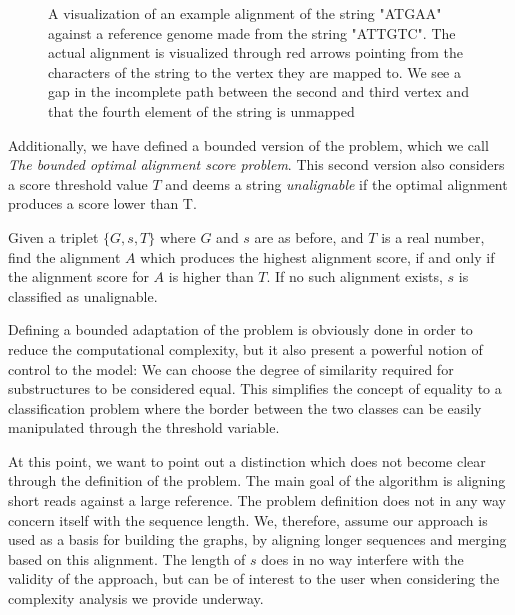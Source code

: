 \documentclass[thesis.tex]{subfiles}
\begin{document}
{\begin{figure}[htpb]
\begin{mdframed}
\begin{center}
    \end{center}
  \end{mdframed}
  \caption[An example alignment]{A visualization of an example alignment of the string "ATGAA" against a reference genome made from the string "ATTGTC". The actual alignment is visualized through red arrows pointing from the characters of the string to the vertex they are mapped to. We see a gap in the incomplete path between the second and third vertex and that the fourth element of the string is unmapped}
\end{figure}
\par\noindent
Additionally, we have defined a bounded version of the problem, which we call \textit{The bounded optimal alignment score problem}. This second version also considers a score threshold value $T$ and deems a string  \textit{unalignable} if the optimal alignment produces a score lower than T.
\begin{defn}
  \label{def:bounded_alignment_problem}
  Given a triplet $\{G, s, T\}$ where $G$ and $s$ are as before, and $T$ is a real number, find the alignment $A$ which produces the highest alignment score, if and only if the alignment score for $A$ is higher than $T$. If no such alignment exists, $s$ is classified as unalignable.
\end{defn}
Defining a bounded adaptation of the problem is obviously done in order to reduce the computational complexity, but it also present a powerful notion of control to the model: We can choose the degree of similarity required for substructures to be considered equal. This simplifies the concept of equality to a classification problem where the border between the two classes can be easily manipulated through the threshold variable.\\
\par\noindent
At this point, we want to point out a distinction which does not become clear through the definition of the problem. The main goal of the algorithm is aligning short reads against a large reference. The problem definition does not in any way concern itself with the sequence length. We, therefore, assume our approach is used as a basis for building the graphs, by aligning longer sequences and merging based on this alignment. The length of $s$ does in no way interfere with the validity of the approach, but can be of interest to the user when considering the complexity analysis we provide underway.
}
\clearpage
\end{document}
